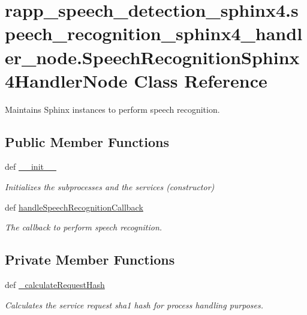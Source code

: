 \hypertarget{classrapp__speech__detection__sphinx4_1_1speech__recognition__sphinx4__handler__node_1_1SpeechRecognitionSphinx4HandlerNode}{\section{rapp\-\_\-speech\-\_\-detection\-\_\-sphinx4.\-speech\-\_\-recognition\-\_\-sphinx4\-\_\-handler\-\_\-node.\-Speech\-Recognition\-Sphinx4\-Handler\-Node Class Reference}
\label{classrapp__speech__detection__sphinx4_1_1speech__recognition__sphinx4__handler__node_1_1SpeechRecognitionSphinx4HandlerNode}
}


Maintains Sphinx instances to perform speech recognition.  


\subsection*{Public Member Functions}
\begin{DoxyCompactItemize}
\item 
def \hyperlink{classrapp__speech__detection__sphinx4_1_1speech__recognition__sphinx4__handler__node_1_1SpeechRecognitionSphinx4HandlerNode_a82c15c573f92e81d51b4d07bdf8d801c}{\-\_\-\-\_\-init\-\_\-\-\_\-}
\begin{DoxyCompactList}\small\item\em Initializes the subprocesses and the services (constructor) \end{DoxyCompactList}\item 
def \hyperlink{classrapp__speech__detection__sphinx4_1_1speech__recognition__sphinx4__handler__node_1_1SpeechRecognitionSphinx4HandlerNode_ab2a5e3c1fb1b126c727ac554147830b1}{handle\-Speech\-Recognition\-Callback}
\begin{DoxyCompactList}\small\item\em The callback to perform speech recognition. \end{DoxyCompactList}\end{DoxyCompactItemize}
\subsection*{Private Member Functions}
\begin{DoxyCompactItemize}
\item 
def \hyperlink{classrapp__speech__detection__sphinx4_1_1speech__recognition__sphinx4__handler__node_1_1SpeechRecognitionSphinx4HandlerNode_ab0aee24f2a30e54932d173dbfe4063aa}{\-\_\-calculate\-Request\-Hash}
\begin{DoxyCompactList}\small\item\em Calculates the service request sha1 hash for process handling purposes. \end{DoxyCompactList}\end{DoxyCompactItemize}
